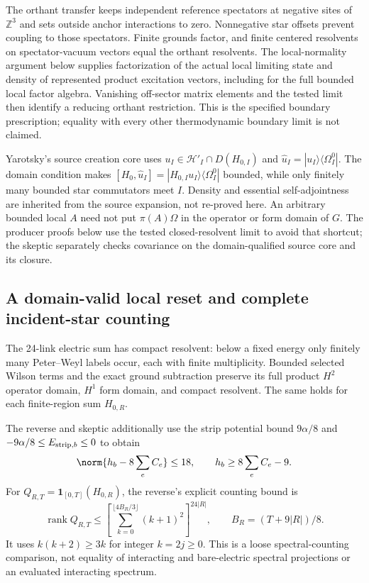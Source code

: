 The orthant transfer keeps independent reference spectators at negative sites of $\mathbb Z^3$ and sets outside anchor interactions to zero. Nonnegative star offsets prevent coupling to those spectators. Finite grounds factor, and finite centered resolvents on spectator-vacuum vectors equal the orthant resolvents. The local-normality argument below supplies factorization of the actual local limiting state and density of represented product excitation vectors, including for the full bounded local factor algebra. Vanishing off-sector matrix elements and the tested limit then identify a reducing orthant restriction. This is the specified boundary prescription; equality with every other thermodynamic boundary limit is not claimed.

Yarotsky's source creation core uses $u_I\in\mathcal H'_I\cap D(H_{0,I})$ and $\widehat u_I=|u_I\rangle\langle\Omega_I^0|$. The domain condition makes $[H_0,\widehat u_I]=|H_{0,I}u_I\rangle\langle\Omega_I^0|$ bounded, while only finitely many bounded star commutators meet $I$. Density and essential self-adjointness are inherited from the source expansion, not re-proved here. An arbitrary bounded local $A$ need not put $\pi(A)\Omega$ in the operator or form domain of $G$. The producer proofs below use the tested closed-resolvent limit to avoid that shortcut; the skeptic separately checks covariance on the domain-qualified source core and its closure.

\subsection{A domain-valid local reset and complete incident-star counting}
The 24-link electric sum has compact resolvent: below a fixed energy only finitely many Peter--Weyl labels occur, each with finite multiplicity. Bounded selected Wilson terms and the exact ground subtraction preserve its full product $H^2$ operator domain, $H^1$ form domain, and compact resolvent. The same holds for each finite-region sum $H_{0,R}$.

The reverse and skeptic additionally use the strip potential bound $9\alpha/8$ and $-9\alpha/8\le E_{{\rm strip},b}\le0$ to obtain
\begin{equation}
 \norm{h_b-8\sum_eC_e}\le18,\qquad
 h_b\ge8\sum_eC_e-9.
\end{equation}
For $Q_{R,T}=\mathbf1_{[0,T]}(H_{0,R})$, the reverse's explicit counting bound is
\begin{equation}
 \operatorname{rank}Q_{R,T}
 \le\left[\sum_{k=0}^{\lfloor4B_R/3\rfloor}(k+1)^2\right]^{24|R|},
 \qquad B_R=(T+9|R|)/8.
 \label{r28:eq:aj1-rank}
\end{equation}
It uses $k(k+2)\ge3k$ for integer $k=2j\ge0$. This is a loose spectral-counting comparison, not equality of interacting and bare-electric spectral projections or an evaluated interacting spectrum.

